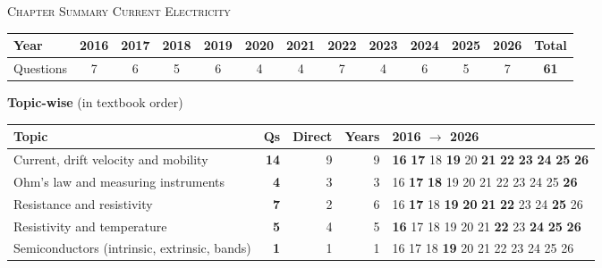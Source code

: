 \begin{center}{}\par
{\large\color{navy}\scshape Chapter Summary \textperiodcentered{} Current Electricity}\end{center}
{\small\setlength{\tabcolsep}{3.5pt}
\begin{tabular*}{\linewidth}{@{\extracolsep{\fill}}l*{11}{c}c@{}}\toprule
Year & 2016 & 2017 & 2018 & 2019 & 2020 & 2021 & 2022 & 2023 & 2024 & 2025 & 2026 & Total\\\midrule
Questions & 7 & 6 & 5 & 6 & 4 & 4 & 7 & 4 & 6 & 5 & 7 & \textbf{61}\\\bottomrule\end{tabular*}}\par\medskip
{\small\textbf{\color{crimson}Topic-wise} (in textbook order)\par\smallskip
\begin{tabularx}{\linewidth}{@{}>{\raggedright\arraybackslash}Xrrrl@{}}\toprule
Topic & Qs & Direct & Years & 2016 $\rightarrow$ 2026\\\midrule
Current, drift velocity and mobility & \textbf{14} & 9 & 9 & {\scriptsize \textbf{16} \textbf{17} {\color{gray!45}18} \textbf{19} {\color{gray!45}20} \textbf{21} \textbf{22} \textbf{23} \textbf{24} \textbf{25} \textbf{26}}\\
Ohm's law and measuring instruments & \textbf{4} & 3 & 3 & {\scriptsize {\color{gray!45}16} \textbf{17} \textbf{18} {\color{gray!45}19} {\color{gray!45}20} {\color{gray!45}21} {\color{gray!45}22} {\color{gray!45}23} {\color{gray!45}24} {\color{gray!45}25} \textbf{26}}\\
Resistance and resistivity & \textbf{7} & 2 & 6 & {\scriptsize {\color{gray!45}16} \textbf{17} {\color{gray!45}18} \textbf{19} \textbf{20} \textbf{21} \textbf{22} {\color{gray!45}23} {\color{gray!45}24} \textbf{25} {\color{gray!45}26}}\\
Resistivity and temperature & \textbf{5} & 4 & 5 & {\scriptsize \textbf{16} {\color{gray!45}17} {\color{gray!45}18} {\color{gray!45}19} {\color{gray!45}20} {\color{gray!45}21} \textbf{22} {\color{gray!45}23} \textbf{24} \textbf{25} \textbf{26}}\\
Semiconductors (intrinsic, extrinsic, bands) & \textbf{1} & 1 & 1 & {\scriptsize {\color{gray!45}16} {\color{gray!45}17} {\color{gray!45}18} \textbf{19} {\color{gray!45}20} {\color{gray!45}21} {\color{gray!45}22} {\color{gray!45}23} {\color{gray!45}24} {\color{gray!45}25} {\color{gray!45}26}}\\

\end{tabularx}}
